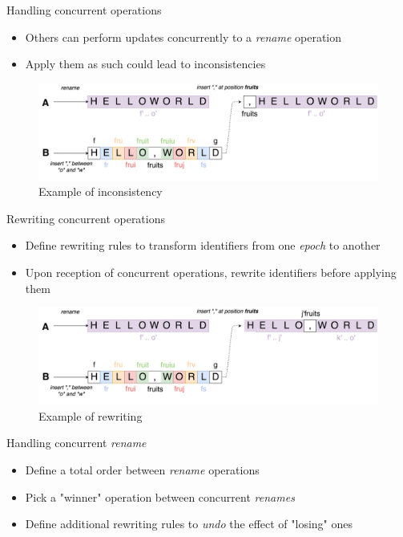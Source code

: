 \documentclass[10pt]{beamer}
\begin{document}
\begin{frame}{Handling concurrent operations}
  \begin{itemize}
    \item Others can perform updates concurrently to a \emph{rename} operation
    \item Apply them as such could lead to inconsistencies
  \end{itemize}
  \begin{figure}
    \includegraphics[scale=0.09]{img/concurrent-insert-inconsistency.png}
    \caption{Example of inconsistency}
  \end{figure}
\end{frame}

\begin{frame}{Rewriting concurrent operations}
  \begin{itemize}
    \item Define rewriting rules to transform identifiers from one \emph{epoch} to another
    \item Upon reception of concurrent operations, rewrite identifiers before applying them
  \end{itemize}
  \begin{figure}
    \includegraphics[scale=0.09]{img/concurrent-insert-rewritted.png}
    \caption{Example of rewriting}
  \end{figure}
\end{frame}

\begin{frame}{Handling concurrent \emph{rename}}
  \begin{itemize}
    \item Define a total order between \emph{rename} operations
    \item Pick a "winner" operation between concurrent \emph{renames}
    \item Define additional rewriting rules to \emph{undo} the effect of "losing" ones
  \end{itemize}
\end{frame}
\end{document}
